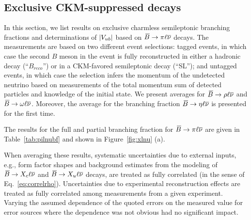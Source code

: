 \subsection{Exclusive CKM-suppressed decays}
\label{slbdecays_b2uexcl}
In this section, we list results on exclusive charmless semileptonic branching fractions
and determinations of $|V_{ub}|$ based on $\kern 0.18em\overline{\kern -0.18em B}{}\to\pi\ell\overline{\nu}$ decays.
The measurements are based on two different event selections: tagged
events, in which case the second $B$ meson in the event is fully
reconstructed in either a hadronic decay (``$B_{reco}$'') or in a 
CKM-favored semileptonic decay (``SL''); and untagged events, in which case the selection infers the momentum
of the undetected neutrino based on measurements of the total 
momentum sum of detected particles and knowledge of the initial state.
We present averages for $\kern 0.18em\overline{\kern -0.18em B}{}\to\rho\ell\overline{\nu}$ and $\kern 0.18em\overline{\kern -0.18em B}{}\to\omega\ell\overline{\nu}$. Moreover, the average for the  branching fraction $\kern 0.18em\overline{\kern -0.18em B}{}\to\eta\ell\overline{\nu}$ is presented for the first time. 

The results for the full and partial branching fraction for $\kern 0.18em\overline{\kern -0.18em B}{}\to\pi\ell\overline{\nu}$ are given
in Table~\ref{tab:pilnubf} and shown in Figure~\ref{fig:xlnu} (a).   

When averaging these results, systematic uncertainties due to external
inputs, e.g., form factor shapes and background estimates from the
modeling of $\kern 0.18em\overline{\kern -0.18em B}{}\to X_c\ell\overline{\nu}$ and $\kern 0.18em\overline{\kern -0.18em B}{}\to X_u\ell\overline{\nu}$ decays, are
treated as fully correlated (in the sense of Eq.~\ref{eq:correlrho}).
Uncertainties due to experimental reconstruction effects are treated
as fully correlated among measurements from a given experiment.  Varying
the assumed dependence of the quoted errors on the measured value
for error sources where the dependence was not obvious had no significant impact.



